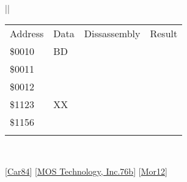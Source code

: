 \documentclass[letterpaper,10pt,english]{sphinxmanual}
\begin{document}
\begin{savenotes}
\begin{tabular}[t]{|*{1}{|}}
\sphinxAtStartPar
{}


\begin{savenotes}\sphinxattablestart
\sphinxthistablewithglobalstyle
\centering
\begin{tabulary}{\linewidth}[t]{|T|T|T|T|}
\sphinxtoprule
\sphinxstyletheadfamily 
\sphinxAtStartPar
Address
&\sphinxstyletheadfamily 
\sphinxAtStartPar
Data
&\sphinxstyletheadfamily 
\sphinxAtStartPar
Dissassembly
&\sphinxstyletheadfamily 
\sphinxAtStartPar
Result
\\
\sphinxmidrule
\sphinxtableatstartofbodyhook
\sphinxAtStartPar
\$0010
&
\sphinxAtStartPar
BD
&%
&%
\\
\sphinxAtStartPar
\$0011
&
&&\\
\sphinxAtStartPar
\$0012
&
&&\\
\sphinxAtStartPar
\$1123
&
\sphinxAtStartPar
XX
&&\\
\sphinxAtStartPar
\$1156
&
&&\\
\sphinxbottomrule
\end{tabulary}
\sphinxtableafterendhook\par
\sphinxattableend\end{savenotes}
\\
\sphinxbottomrule
\end{tabular}
\sphinxtableafterendhook\par
\sphinxattableend\end{savenotes}

\sphinxAtStartPar
{[}\hyperlink{cite.index:id11}{Car84}{]} {[}\hyperlink{cite.index:id15}{MOS Technology, Inc.76b}{]} {[}\hyperlink{cite.index:id9}{Mor12}{]}
\end{document}
